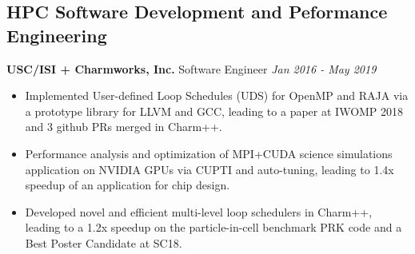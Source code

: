 \subsection*{HPC Software Development and Peformance Engineering}
\newcommand{\myExpFour}{
\item Implemented User-defined Loop Schedules (UDS) for OpenMP and RAJA via a prototype library for LLVM and GCC, leading to a paper at IWOMP 2018 and 3 github PRs merged in Charm++. 

\item Performance analysis and optimization of MPI+CUDA science simulations application on NVIDIA GPUs via CUPTI and auto-tuning, leading to 1.4x speedup of an application for chip design. 
\item Developed novel and efficient multi-level loop schedulers in Charm++, leading to a 1.2x speedup on the particle-in-cell benchmark PRK code and a Best Poster Candidate at SC18.
}
\noindent
\textbf{USC/ISI + Charmworks, Inc.}\hfill
{Software Engineer} \hfill \textit{Jan 2016 - May 2019}
\vspace{-0.1in}
\begin{itemize}[itemsep=-0.1em]
\myExpFour
\end{itemize}


